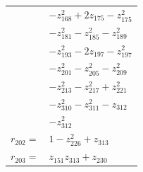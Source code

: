 \begin{longtable}{@{}r@{\;}l@{}}
 & \(\displaystyle -z_{168}^{2} +2z_{175} -z_{175}^{2}\) \\
 & \(\displaystyle -z_{181}^{2} -z_{185}^{2} -z_{189}^{2}\) \\
 & \(\displaystyle -z_{193}^{2} -2z_{197} -z_{197}^{2}\) \\
 & \(\displaystyle -z_{201}^{2} -z_{205}^{2} -z_{209}^{2}\) \\
 & \(\displaystyle -z_{213}^{2} -z_{217}^{2} +z_{221}^{2}\) \\
 & \(\displaystyle -z_{310}^{2} -z_{311}^{2} -z_{312}\) \\
 & \(\displaystyle -z_{312}^{2}\) \\[3pt]
\(r_{202}=\) & \(\displaystyle 1 -z_{226}^{2} +z_{313}\) \\[3pt]
\(r_{203}=\) & \(\displaystyle z_{151}z_{313} +z_{230}\) \\[3pt]
\end{longtable}
\endgroup
